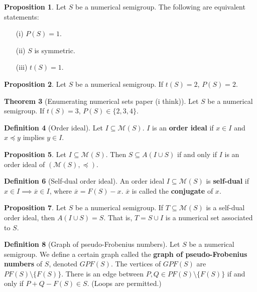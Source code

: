 \documentclass{article}
\theoremstyle{definition}
\newtheorem{thm}{Theorem}[section]
\theoremstyle{definition}
\newtheorem{defn}[thm]{Definition}
\theoremstyle{definition}
\newtheorem{prop}[thm]{Proposition}
\begin{document}
\begin{prop}
    Let $S$ be a numerical semigroup. The following are equivalent statements:
    \begin{enumerate}
        \item[(i)] $P(S) = 1$.
        \item[(ii)] $S$ is symmetric.
        \item[(iii)] $t(S) =1$.
    \end{enumerate}
\end{prop}

\begin{prop}
    Let $S$ be a numerical semigroup. If $t(S) = 2$, $P(S) = 2$.
\end{prop}

\begin{thm}[Enumerating numerical sets paper (i think)]
    Let $S$ be a numerical semigroup. If $t(S) = 3$, $P(S) \in \{2, 3, 4\}$.
\end{thm}

\begin{defn}[Order ideal]
    Let $I \subseteq \mathcal{M}(S)$. $I$ is an \textbf{order ideal} if $x \in I$ and $x \preceq y$ implies $y \in I$.
\end{defn}

\begin{prop}
    Let $I \subseteq \mathcal{M}(S)$. Then $S\subseteq A(I\cup S)$ if and only if $I$ is an order ideal of $(\mathcal{M}(S), \preceq)$.
\end{prop}

\begin{defn}[Self-dual order ideal]
    An order ideal $I\subseteq \mathcal{M}(S)$ is \textbf{self-dual} if $x\in I \implies \overline{x} \in I$, where $\overline{x} = F(S) - x$. $\overline{x}$ is called the \textbf{conjugate} of $x$.
    
\end{defn}

\begin{prop}
    Let $S$ be a numerical semigroup. If $T \subseteq \mathcal{M}(S)$ is a self-dual order ideal, then $A(I\cup S) = S$. That is, $T = S \cup I$ is a numerical set associated to $S$.
\end{prop}

\begin{defn}[Graph of pseudo-Frobenius numbers]
    Let $S$ be a numerical semigroup. We define a certain graph called the \textbf{graph of pseudo-Frobenius numbers} of $S$, denoted $GPF(S)$. The vertices of $GPF(S)$ are $PF(S) \setminus \{F(S)\}$. There is an edge between $P, Q \in PF(S) \setminus \{F(S)\}$ if and only if $P+Q-F(S) \in S$. (Loops are permitted.)
\end{defn}
\end{document}
